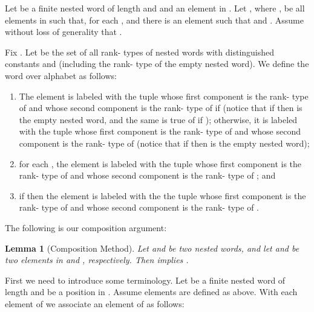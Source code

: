 \documentclass{LMCS}
\theoremstyle{plain}
\newtheorem{lemma}[theorem]{Lemma}
\theoremstyle{definition}
\begin{document}
Let  be a finite nested word of length  and   
and  an element in . Let
 , where , be all elements in  such that,
 for each ,  and there is an
 element  such
  that  and . Assume without loss of
 generality that .  

Fix .  Let  be the set of all rank- types of
nested words with distinguished constants  and 
(including the rank- type of the empty nested word). We define the
word  over alphabet  as follows:

\begin{enumerate}[] 

\item The element  is labeled
with the tuple whose first component is
 the rank- type of
  and whose second component is the rank-  
type of 
 if  (notice that if  then 
 is the empty nested word, and the same is true of
 if ); otherwise, it 
is labeled with the tuple whose first component is
 the rank-  type of
  and whose second component is the rank-  
type of 
 (notice that if  then 
 is the empty nested word);

\item 
for each , the element  is labeled with the tuple whose
 first component is 
 the rank- type of  and 
whose second component is 
 the rank- type of ; and 

\item if  then the element 
 is labeled with the 
the tuple whose first component is the 
rank- type of  and 
whose second component is the rank- type of 
.    
\end{enumerate} 

The following is our composition argument: 

\begin{lemma}[Composition Method] \label{lemma:comp} Let  and
 be two nested words, and let  and  be two elements in
 and , respectively.  
Then  implies .  \end{lemma}

\proof
First we need to introduce some terminology.  Let  be a finite nested
word of length  and  be a position in . Assume elements
 are defined as above.  With each element 
of  we associate an element  of  as
follows:
\end{document}
